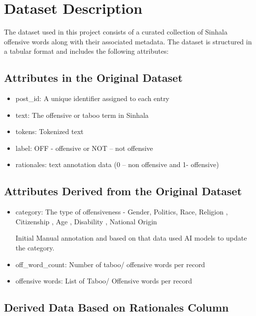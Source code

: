 \documentclass[12pt]{article}
\begin{document}
\section{Dataset Description}

The dataset used in this project consists of a curated collection of Sinhala offensive words along with their associated metadata. The dataset is structured in a tabular format and includes the following attributes:

\subsection{Attributes in the Original Dataset}

\begin{itemize}
    \item post\_id: A unique identifier assigned to each entry
    \item text: The offensive or taboo term in Sinhala
    \item tokens: Tokenized text
    \item label: OFF - offensive or NOT – not offensive
    \item rationales: text annotation data (0 – non offensive and 1- offensive)
\end{itemize}

\subsection{Attributes Derived from the Original Dataset}

\begin{itemize}
    \item category: The type of offensiveness - Gender, Politics, Race, Religion , Citizenship , Age , Disability , National Origin

    Initial Manual annotation and based on that data used AI models to update the category.

    \item off\_word\_count: Number of taboo/ offensive words per record

    \item offensive words: List of Taboo/ Offensive words per record
\end{itemize}

\subsection{Derived Data Based on Rationales Column}
\end{document}
